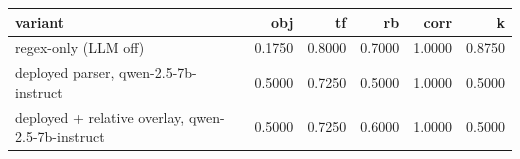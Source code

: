 \begin{tabular}{lrrrrr}
\toprule
                                          variant &    obj &     tf &     rb &   corr &      k \\
\midrule
                             regex-only (LLM off) & 0.1750 & 0.8000 & 0.7000 & 1.0000 & 0.8750 \\
            deployed parser, qwen-2.5-7b-instruct & 0.5000 & 0.7250 & 0.5000 & 1.0000 & 0.5000 \\
deployed + relative overlay, qwen-2.5-7b-instruct & 0.5000 & 0.7250 & 0.6000 & 1.0000 & 0.5000 \\
\bottomrule
\end{tabular}
